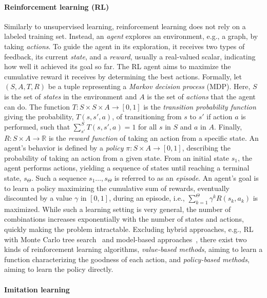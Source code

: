 \documentclass[twoside,11pt]{article}
\newcommand{\new}[1]{\emph{#1}}
\begin{document}
\paragraph{Reinforcement learning (RL)} Similarly to unsupervised learning, reinforcement learning does not rely on a labeled training set. Instead, an \new{agent} explores an environment, e.g., a graph,
by taking \emph{actions}. To guide the agent in its exploration, it receives two types of feedback, its current \new{state}, and a \new{reward}, usually a real-valued scalar, indicating how well it achieved its goal so far. The RL agent aims to maximize the cumulative reward it receives by determining the best actions.
Formally, let $( S, A, T, R)$ be a tuple representing a \textit{Markov decision process} (MDP). Here, $S$ is the set of \new{states} in the environment and $A$ is the set of \new{actions} that the agent can do. The function $T \colon S \times S \times A \to [0,1]$ is the \new{transition probability function} giving the probability, $T(s, s', a)$, of transitioning from $s$ to $s'$ if action $a$ is performed, such that $\sum_{s'}^S T(s, s', a) = 1$ for all $s$ in $S$ and  $a$ in $A$.
Finally, $R  \colon S \times A \to \mathbb{R}$ is the \new{reward function} of taking an action from a specific state.
An agent's behavior is defined by a \new{policy} $\pi  \colon S \times A \to [0,1]$, describing the probability of taking an action from a given state.
From an initial state $s_1$, the agent performs actions, yielding a sequence of states until reaching a terminal state, $s_{\Theta}$. Such a sequence $s_1\dots,s_\Theta$ is referred to as an \new{episode}. An agent's goal is to learn a policy maximizing the cumulative sum of rewards, eventually discounted by a value $\gamma$ in $[0,1]$, during an episode, i.e.,  $\sum_{k=1}^{\Theta}  \gamma^{k} R(s_k, a_k)$ is maximized.  While such a learning setting is very general, the number of combinations increases exponentially with the number of states and actions, quickly making the problem intractable.
Excluding hybrid approaches, e.g., RL with Monte Carlo tree search~\citep{browne2012survey} and model-based approaches~\citep{polydoros2017survey}, there exist two kinds of reinforcement learning algorithms, \new{value-based methods}, aiming to learn a function characterizing the goodness of each action,
and \new{policy-based methods}, aiming to learn the policy directly.

\paragraph{Imitation learning}
\end{document}

